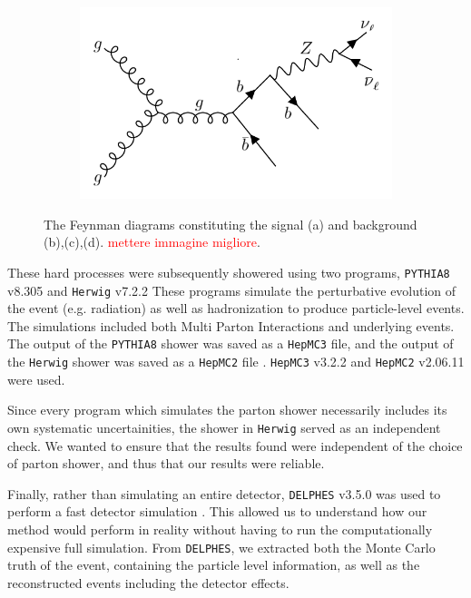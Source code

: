 \documentclass[10pt,a4paper]{book}
\newcommand\todo[1]{\textcolor{red}{#1}}
\def\code#1{\texttt{#1}}
\begin{document}
\begin{figure}
\begin{subfigure}{.5\textwidth}
\caption{}
\end{subfigure}
\begin{subfigure}{.5\textwidth}
\centering
\includegraphics[scale=0.15]{ch4_images/gbb3}
\caption{}
\end{subfigure}
\caption{The Feynman diagrams constituting the signal (a) and background (b),(c),(d). \todo{mettere immagine migliore}.}
\label{zhbb + gbb feynman diagrams}
\end{figure}

These hard processes were subsequently showered using two programs, \code{PYTHIA8} v8.305 \cite{Sjostrand:2014zea} and \code{Herwig} v7.2.2 \cite{B_hr_2008, Bellm:2015jjp} These programs simulate the perturbative evolution of the event (e.g. radiation) as well as hadronization to produce particle-level events. The simulations included both Multi Parton Interactions and underlying events. The output of the \code{PYTHIA8} shower was saved as a \code{HepMC3} file, and the output of the \code{Herwig} shower was saved as a \code{HepMC2} file \cite{BUCKLEY2021107310, Dobbs:2001ck}. \code{HepMC3} v3.2.2 and \code{HepMC2} v2.06.11 were used.

Since every program which simulates the parton shower necessarily includes its own systematic uncertainities, the shower in \code{Herwig} served as an independent check. We wanted to ensure that the results found were independent of the choice of parton shower, and thus that our results were reliable.

Finally, rather than simulating an entire detector, \code{DELPHES} v3.5.0 was used to perform a fast detector simulation \cite{Ovyn:2009tx, deFavereau:2013fsa}. This allowed us to understand how our method would perform in reality without having to run the computationally expensive full simulation. From \code{DELPHES}, we extracted both the Monte Carlo truth of the event, containing the particle level information, as well as the reconstructed events including the detector effects. 
\end{document}
